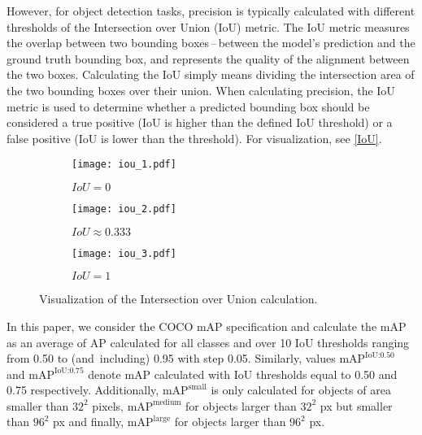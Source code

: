 However, for object detection tasks, precision is typically calculated with
different thresholds of the Intersection over Union (IoU) metric. The IoU metric
measures the overlap between two bounding boxes\,--\,between the model's
prediction and the ground truth bounding box, and represents the quality of the alignment
between the two boxes. Calculating the IoU simply means dividing the
intersection area of the two bounding boxes over their union. When calculating
precision, the IoU metric is used to determine whether a predicted bounding box
should be considered a true positive (IoU is higher than the defined IoU
threshold) or a false positive (IoU is lower than the threshold). For
visualization, see \autoref{IoU}.

\begin{figure}[h]
    \centering
    \begin{subfigure}[b]{0.3125\textwidth}
        \texttt{[image: iou\_1.pdf]}
        \caption{$IoU = 0$}
    \end{subfigure}
    \hfill
    \begin{subfigure}[b]{0.2272727\textwidth}
        \texttt{[image: iou\_2.pdf]}
        \caption{$IoU \approx 0.333$}
    \end{subfigure}
    \hfill
    \begin{subfigure}[b]{0.15151515\textwidth}
        \texttt{[image: iou\_3.pdf]}
        \caption{$IoU = 1$}
    \end{subfigure}

    \caption{Visualization of the Intersection over Union calculation.}
    \label{IoU}
\end{figure}

In this paper, we consider the COCO mAP specification and calculate the mAP as
an average of AP calculated for all classes and over 10 IoU thresholds ranging
from \num{0.50} to (and~including) \num{0.95} with step \num{0.05}. Similarly,
values $\text{mAP}^{\text{IoU:0.50}}$ and $\text{mAP}^{\text{IoU:0.75}}$ denote
mAP calculated with IoU thresholds equal to \num{0.50} and \num{0.75}
respectively. Additionally, $\text{mAP}^{\text{small}}$ is only calculated for
objects of area smaller than $32^2$ pixels, $\text{mAP}^{\text{medium}}$ for
objects larger than $32^2$ px but smaller than $96^2$ px and finally,
$\text{mAP}^{\text{large}}$ for objects larger than $96^2$ px.


